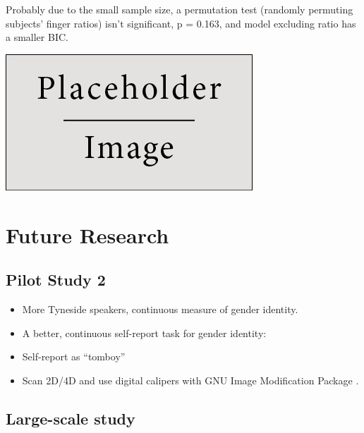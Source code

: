 \documentclass[a0,portrait]{a0poster}
\begin{document}
\begin{multicols}{2}
Probably due to the small sample size, a permutation test (randomly permuting subjects' finger ratios) isn't significant, p = 0.163, and model excluding ratio has a smaller BIC.


\begin{center}\vspace{1cm}
\includegraphics[width=0.8\linewidth]{placeholder}
\end{center}\vspace{1cm}


\section*{Future Research}

\subsection{Pilot Study 2}
\begin{itemize}
\item More Tyneside speakers, continuous measure of gender identity.
\item A better, continuous self-report task for gender identity:
\end{itemize}
\begin{itemize}
\item Self-report as ``tomboy''
\item Scan 2D/4D and use digital calipers with GNU Image Modification Package \citep[][]{allawayetal2009}.
\end{itemize}

\subsection{Large-scale study}



\end{multicols}
\end{document}
